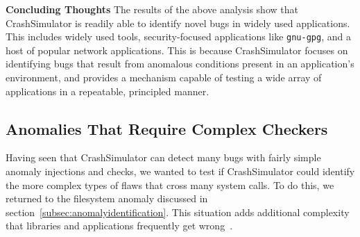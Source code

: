 {\bf Concluding Thoughts}
The results of the above analysis show that CrashSimulator is readily able to
identify novel bugs in widely used applications.  This includes
widely used tools, security-focused applications like {\tt gnu-gpg}, and 
a host of popular network applications.  This is
because CrashSimulator focuses on identifying bugs that result from anomalous
conditions present in an application's environment, and provides
a mechanism capable of testing a wide array of applications in a
repeatable, principled manner.



\subsection{Anomalies That Require Complex Checkers}
\label{sec-complex}


Having seen that CrashSimulator can detect many bugs with fairly 
simple anomaly injections and checks,
we wanted to test if CrashSimulator could identify the more complex types
of flaws that cross many system calls.
To do this, we returned to
the filesystem anomaly discussed in
section~\ref{subsec:anomalyidentification}.  This situation adds additional complexity that libraries and applications
frequently get wrong~\cite{PHPRenameBug,PythonShutilBug,NodejsCopyBug}.

